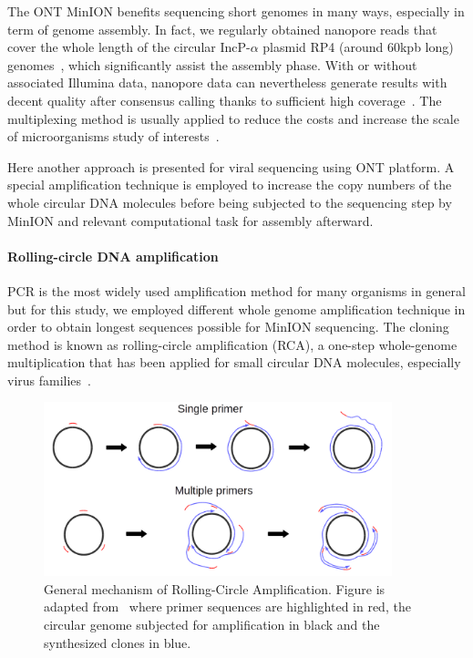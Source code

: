 The ONT MinION benefits sequencing short genomes in many ways, especially in term of genome assembly. 
In fact, we regularly obtained nanopore reads that cover the whole length of the circular IncP-$\alpha$ plasmid RP4 (around $60$kpb long) genomes~\cite{Lu2018plamids}, which significantly assist the assembly phase.   
With or without associated Illumina data, nanopore data can nevertheless generate results with decent quality after consensus calling thanks to sufficient high coverage~\cite{Vaser2017racon}.
The multiplexing method is usually applied to reduce the costs and increase the scale of microorganisms study of interests~\cite{Quick2017GP}.

Here another approach is presented for viral sequencing using ONT platform. A special amplification technique is employed to increase the copy numbers of the whole circular DNA molecules before being subjected to the sequencing step by MinION and relevant computational task for assembly afterward.

\paragraph{Rolling-circle DNA amplification}
PCR is the most widely used amplification method for many organisms in general but for this study, we employed different whole genome amplification technique in order to obtain longest sequences possible for MinION sequencing.
The cloning method is known as rolling-circle amplification (RCA), a one-step whole-genome multiplication that has been applied for small circular DNA molecules, especially virus families~\cite{Rector2004rca14,Inoue2004rca28,Schubert2007rca30,Knierim200rca31,Shepherd2008rca32,Haible2006rca33,Homs2008rca34}.

\begin{figure}[!hpt]
\centerline{\includegraphics[width=0.9\textwidth]{images/rca.png}}
\caption[Rolling Circle Amplification]{General mechanism of Rolling-Circle Amplification. Figure is adapted from~\cite{Johne2009rca} where primer sequences are highlighted in red, the circular genome subjected for amplification in black and the synthesized clones in blue.}
\label{fig:concat_rca}
\end{figure}

